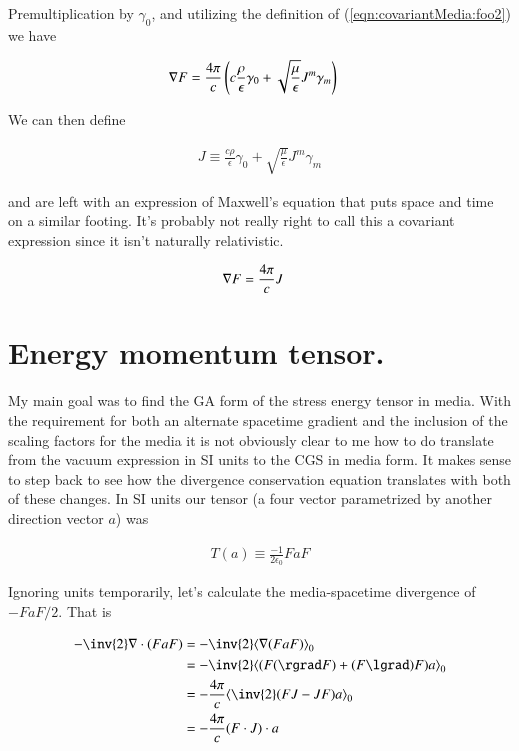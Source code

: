 Premultiplication by $\gamma_0$, and utilizing the definition of (\ref{eqn:covariantMedia:foo2}) we have

\begin{align}\label{eqn:covariantMedia:foo8}
\nabla F &= \frac{4 \pi}{c} \left( c \frac{\rho}{\epsilon} \gamma_0 + \sqrt{\frac{\mu}{\epsilon}} J^m \gamma_m \right)
\end{align}

We can then define

\begin{align}\label{eqn:covariantMedia:foo9}
J \equiv \frac{c \rho}{\epsilon} \gamma_0 + \sqrt{\frac{\mu}{\epsilon}} J^m \gamma_m
\end{align}

and are left with an expression of Maxwell's equation that puts space and time on a similar footing.  It's probably not really right to call this a covariant expression since it isn't naturally relativistic.

\begin{align}\label{eqn:covariantMedia:foo10}
\nabla F &= \frac{4 \pi}{c} J
\end{align}

\section{Energy momentum tensor.}

My main goal was to find the GA form of the stress energy tensor in media.  With the requirement for both an alternate spacetime gradient and the inclusion of the scaling factors for the media it is not obviously clear to me how to do translate from the vacuum expression in SI units to the CGS in media form.  It makes sense to step back to see how the divergence conservation equation translates with both of these changes.  In SI units our tensor (a four vector parametrized by another direction vector $a$) was

\begin{align}\label{eqn:covariantMedia:foo11}
T(a) \equiv \frac{-1}{2\epsilon_0} F a F
\end{align}

Ignoring units temporarily, let's calculate the media-spacetime divergence of $-FaF/2$.  That is

\begin{align*}
-\inv{2} \grad \cdot (FaF)
&=
-\inv{2} \gpgradezero{\grad (FaF)} \\
&=
-\inv{2} \gpgradezero{(F(\rgrad F) + (F\lgrad)F) a} \\
&=
-\frac{4\pi}{c} \gpgradezero{\inv{2}(F J - J F) a} \\
&=
-\frac{4\pi}{c} (F \cdot J) \cdot a \\
\end{align*}

